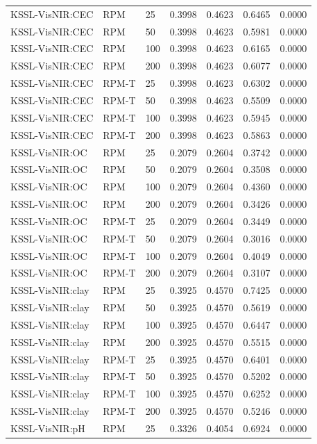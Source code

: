 \begin{tabular}{lllllll}
KSSL-VisNIR:CEC & RPM & 25 & 0.3998 & 0.4623 & 0.6465 & 0.0000 \\
KSSL-VisNIR:CEC & RPM & 50 & 0.3998 & 0.4623 & 0.5981 & 0.0000 \\
KSSL-VisNIR:CEC & RPM & 100 & 0.3998 & 0.4623 & 0.6165 & 0.0000 \\
KSSL-VisNIR:CEC & RPM & 200 & 0.3998 & 0.4623 & 0.6077 & 0.0000 \\
KSSL-VisNIR:CEC & RPM-T & 25 & 0.3998 & 0.4623 & 0.6302 & 0.0000 \\
KSSL-VisNIR:CEC & RPM-T & 50 & 0.3998 & 0.4623 & 0.5509 & 0.0000 \\
KSSL-VisNIR:CEC & RPM-T & 100 & 0.3998 & 0.4623 & 0.5945 & 0.0000 \\
KSSL-VisNIR:CEC & RPM-T & 200 & 0.3998 & 0.4623 & 0.5863 & 0.0000 \\
KSSL-VisNIR:OC & RPM & 25 & 0.2079 & 0.2604 & 0.3742 & 0.0000 \\
KSSL-VisNIR:OC & RPM & 50 & 0.2079 & 0.2604 & 0.3508 & 0.0000 \\
KSSL-VisNIR:OC & RPM & 100 & 0.2079 & 0.2604 & 0.4360 & 0.0000 \\
KSSL-VisNIR:OC & RPM & 200 & 0.2079 & 0.2604 & 0.3426 & 0.0000 \\
KSSL-VisNIR:OC & RPM-T & 25 & 0.2079 & 0.2604 & 0.3449 & 0.0000 \\
KSSL-VisNIR:OC & RPM-T & 50 & 0.2079 & 0.2604 & 0.3016 & 0.0000 \\
KSSL-VisNIR:OC & RPM-T & 100 & 0.2079 & 0.2604 & 0.4049 & 0.0000 \\
KSSL-VisNIR:OC & RPM-T & 200 & 0.2079 & 0.2604 & 0.3107 & 0.0000 \\
KSSL-VisNIR:clay & RPM & 25 & 0.3925 & 0.4570 & 0.7425 & 0.0000 \\
KSSL-VisNIR:clay & RPM & 50 & 0.3925 & 0.4570 & 0.5619 & 0.0000 \\
KSSL-VisNIR:clay & RPM & 100 & 0.3925 & 0.4570 & 0.6447 & 0.0000 \\
KSSL-VisNIR:clay & RPM & 200 & 0.3925 & 0.4570 & 0.5515 & 0.0000 \\
KSSL-VisNIR:clay & RPM-T & 25 & 0.3925 & 0.4570 & 0.6401 & 0.0000 \\
KSSL-VisNIR:clay & RPM-T & 50 & 0.3925 & 0.4570 & 0.5202 & 0.0000 \\
KSSL-VisNIR:clay & RPM-T & 100 & 0.3925 & 0.4570 & 0.6252 & 0.0000 \\
KSSL-VisNIR:clay & RPM-T & 200 & 0.3925 & 0.4570 & 0.5246 & 0.0000 \\
KSSL-VisNIR:pH & RPM & 25 & 0.3326 & 0.4054 & 0.6924 & 0.0000 \\

\end{tabular}
